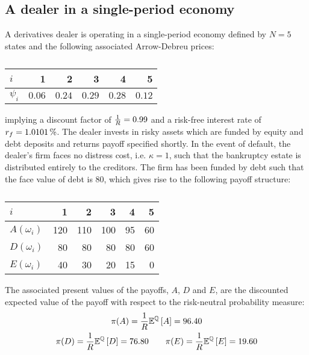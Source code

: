 \documentclass[main.tex]{subfiles}
\begin{document}
    \subsection{A dealer in a single-period economy}

    A derivatives dealer is operating in a single-period economy
    defined by $N=5$ states and the following associated Arrow-Debreu prices:
        \begin{table}[H]
            \centering
            \begin{tabular}{l|rrrrr}
                $i$ & 1 & 2 & 3 & 4 & 5 \\
                \hline
                $\psi_{i}$ & $\num{0.06}$ & $\num{0.24}$ & $\num{0.29}$ & $\num{0.28}$ & $\num{0.12}$ \\
            \end{tabular}
            \caption{}
            \label{tbl:example-firm-structure}
        \end{table}
    implying a discount factor of $\frac{1}{R} = \num{0.99}$ and a risk-free interest rate of $\rfrate = \pct{0.010101}$.
    The dealer invests in risky assets 
    which are funded by equity and debt deposits and returns payoff specified shortly.
    In the event of default, the dealer's firm faces no distress cost, i.e. $\kappa = 1$, 
    such that the bankruptcy estate is distributed entirely to the creditors.
    The firm has been funded by debt such that the face value of debt is $\num{80}$, 
    which gives rise to the following payoff structure:
    \begin{table}[H]
        \centering
        \begin{tabular}{l|rrrrr}
            $i$ & 1 & 2 & 3 & 4 & 5 \\
            \hline
            $A(\omega_{i})$ & \num{120} & \num{110} & \num{100} & \num{95} & \num{60} \\
            $D(\omega_{i})$ & \num{80} & \num{80} & \num{80} & \num{80} & \num{60} \\
            $E(\omega_{i})$ & \num{40} & \num{30} & \num{20} & \num{15} & \num{0}
        \end{tabular}
        \caption{}
        \label{tbl:example-pre-project-capital-structure}
    \end{table}
    The associated present values of the payoffs, $A$, $D$ and $E$, 
    are the discounted expected value of the payoff 
    with respect to the risk-neutral probability measure:
        \begin{gather*}
            \pi(A) = \frac{1}{R} \mathbb{E}^{\mathbb{Q}}\left[A\right] = \num{96.40} \\
            \pi(D) = \frac{1}{R} \mathbb{E}^{\mathbb{Q}}\left[D\right] = \num{76.80}
            \qquad \pi(E) = \frac{1}{R} \mathbb{E}^{\mathbb{Q}}\left[E\right] = \num{19.60}
        \end{gather*}
\end{document}
